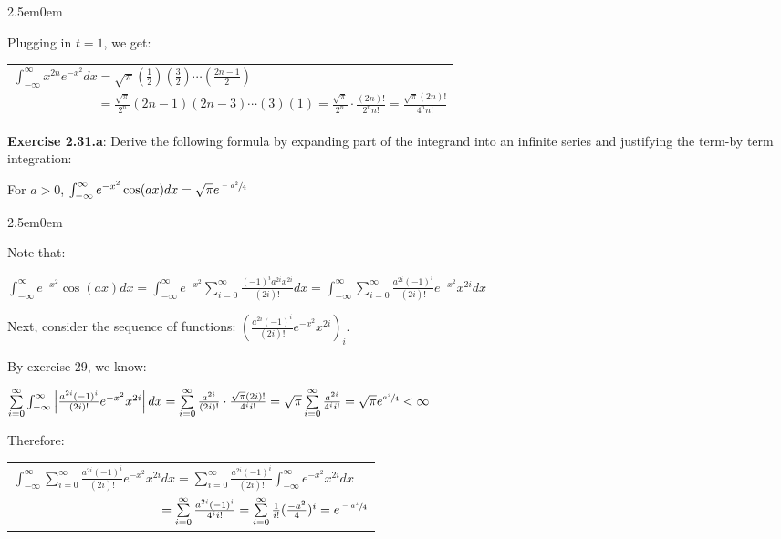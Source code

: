 \documentclass{book}
\newcommand{\exTwoP}{%
   \color{RedViolet}%
   \fontsize{13}{15}\selectfont%
}
\newenvironment{myIndent}{%
   \begin{adjustwidth}{2.5em}{0em}%
}{%
   \end{adjustwidth}%
}
\newcommand{\blab}[1]{\textbf{#1}}
\newcommand{\retTwo}{\hfill\bigbreak}
\begin{document}
\begin{myIndent}
	Plugging in $t = 1$, we get:
	
	{\centering\begin{tabular}{l}
		$\int_{-\infty}^\infty x^{2n}e^{-x^2}dx = \sqrt{\pi}(\frac{1}{2})(\frac{3}{2})\cdots (\frac{2n-1}{2})$\\
		$\phantom{\int_{-\infty}^\infty x^{2n}e^{-x^2}dx} = \frac{\sqrt{\pi}}{2^n}(2n-1)(2n-3)\cdots(3)(1) = \frac{\sqrt{\pi}}{2^n} \cdot \frac{(2n)!}{2^n n!} = \frac{\sqrt{\pi}(2n)!}{4^{n} n!}$
	\end{tabular}\retTwo\par}
\end{myIndent}

\blab{Exercise 2.31.a}: Derive the following formula by expanding part of the integrand into an infinite series and justifying the term-by term integration:

{\centering For $a > 0$, $\int_{-\infty}^\infty e^{-x^2}\cos(ax)dx = \sqrt{\pi}e^{\sfrac{-a^2}{4}}$ \retTwo\par}

\begin{myIndent}\exTwoP

	Note that:
	
	{\centering $\int_{-\infty}^\infty e^{-x^2}\cos(ax)dx = \int_{-\infty}^\infty e^{-x^2}\sum\limits_{i = 0}^{\infty}\frac{(-1)^i a^{2i}x^{2i}}{(2i)!}dx = \int_{-\infty}^\infty\sum\limits_{i=0}^\infty \frac{a^{2i}(-1)^i}{(2i)!}e^{-x^2}x^{2i}dx$\retTwo\par}

	Next, consider the sequence of functions: $\left(\frac{a^{2i}(-1)^i}{(2i)!}e^{-x^2}x^{2i}\right)_{i}$.\retTwo

	By exercise 29, we know:
	
	{\centering $\sum\limits_{i=0}^\infty \int_{-\infty}^\infty \left|\frac{a^{2i}(-1)^i}{(2i)!}e^{-x^2}x^{2i}\right|dx = \sum\limits_{i=0}^\infty \frac{a^{2i}}{(2i)!} \cdot \frac{\sqrt{\pi}(2i)!}{4^i i!} = \sqrt{\pi}\sum\limits_{i=0}^\infty \frac{a^{2i}}{4^i i!} = \sqrt{\pi} e^{\sfrac{a^2}{4}} < \infty$\retTwo\par}

	Therefore:
	
	{\centering 
	\begin{tabular}{l}
		$\int_{-\infty}^\infty\sum\limits_{i=0}^\infty \frac{a^{2i}(-1)^i}{(2i)!}e^{-x^2}x^{2i}dx = \sum\limits_{i=0}^\infty\frac{a^{2i}(-1)^i}{(2i)!}\int_{-\infty}^\infty e^{-x^2}x^{2i}dx$\\ [8pt]
		$\phantom{\int_{-\infty}^\infty\sum\limits_{i=0}^\infty \frac{a^{2i}(-1)^i}{(2i)!}e^{-x^2}x^{2i}dx} = \sum\limits_{i=0}^\infty \frac{a^{2i}(-1)^i}{4^i i!} = \sum\limits_{i = 0}^\infty \frac{1}{i!}(\frac{-a^2}{4})^i = e^{\sfrac{-a^2}{4}}$
	\end{tabular}\newpage\par}
\end{myIndent}
\end{document}
